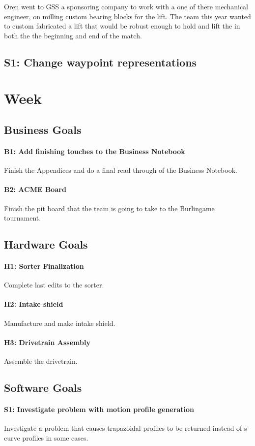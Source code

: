 \documentclass{article}
\begin{document}
Oren went to GSS a sponsoring company to work with a one of there mechanical engineer, on milling custom bearing blocks for the lift. The team this year wanted to custom fabricated a lift that would be robust enough to hold and lift the in both the the beginning and end of the match. 
\subsection{S1: Change waypoint representations}

\clearpage \newpage \section{Week \thesection} 
\subsection{Business Goals}
\paragraph{B1: Add finishing touches to the Business Notebook}
 Finish the Appendices and do a final read through of the Business Notebook.
\paragraph{B2: ACME Board}
 Finish the pit board that the team is going to take to the Burlingame tournament.
\subsection{Hardware Goals}
\paragraph{H1: Sorter Finalization}
 Complete last edits to the sorter.
\paragraph{H2: Intake shield}
 Manufacture and make intake shield.
\paragraph{H3: Drivetrain Assembly}
 Assemble the drivetrain.
\subsection{Software Goals}
\paragraph{S1: Investigate problem with motion profile generation}
 Investigate a problem that causes trapazoidal profiles to be returned instead of s-curve profiles in some cases.
\newpage
\end{document}
